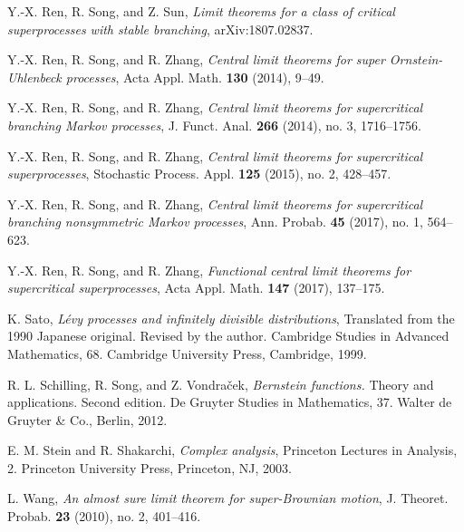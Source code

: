 \documentclass[12pt,a4paper]{amsart}
\theoremstyle{plain}
\theoremstyle{definition}
\numberwithin{equation}{section}
\begin{document}
\begin{thebibliography}{10}
  Y.-X. Ren, R. Song, and Z. Sun,
  \emph{Limit theorems for a class of critical superprocesses with stable branching},
  arXiv:1807.02837.

  Y.-X. Ren, R. Song, and R. Zhang,
  \emph{Central limit theorems for super {O}rnstein-{U}hlenbeck processes},
  Acta Appl. Math. \textbf{130} (2014), 9--49.

  Y.-X. Ren, R. Song, and R. Zhang,
  \emph{Central limit theorems for supercritical branching {M}arkov processes},
  J. Funct. Anal. \textbf{266} (2014), no. 3, 1716--1756.

  Y.-X. Ren, R. Song, and R. Zhang,
  \emph{Central limit theorems for supercritical superprocesses},
  Stochastic Process. Appl. \textbf{125} (2015), no. 2, 428--457.

  Y.-X. Ren, R. Song, and R. Zhang,
  \emph{Central limit theorems for supercritical branching nonsymmetric {M}arkov processes},
  Ann. Probab. \textbf{45} (2017), no. 1, 564--623.

  Y.-X. Ren, R. Song, and R. Zhang,
  \emph{Functional central limit theorems for supercritical superprocesses},
  Acta Appl. Math. \textbf{147} (2017), 137--175.

  K. Sato,
  \emph{L{\'e}vy processes and infinitely divisible distributions},
  Translated from the 1990 Japanese original. Revised by the author. Cambridge Studies in Advanced Mathematics, 68. Cambridge University Press, Cambridge, 1999.

  R. L. Schilling, R. Song, and Z. Vondra\v{c}ek,
  \emph{Bernstein functions.}
  Theory and applications. Second edition. De Gruyter Studies in Mathematics, 37. Walter de Gruyter \& Co., Berlin, 2012.

  E. M. Stein and R. Shakarchi, \emph{Complex analysis},
  Princeton Lectures in Analysis, 2. Princeton University Press, Princeton, NJ, 2003.

  L. Wang, \emph{An almost sure limit theorem for super-{B}rownian motion},
  J. Theoret. Probab. \textbf{23} (2010), no. 2, 401--416.

\end{thebibliography}
\end{document}

